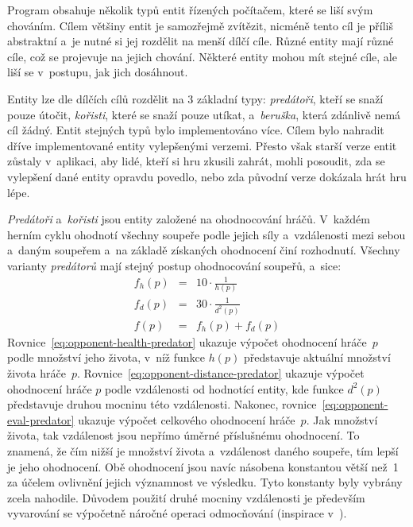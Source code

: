 Program obsahuje několik typů entit řízených počítačem, které se liší svým chováním. Cílem většiny entit je samozřejmě zvítězit, nicméně tento cíl je příliš abstraktní a~je nutné si jej rozdělit na menší dílčí cíle. Různé entity mají různé cíle, což se projevuje na jejich chování. Některé entity mohou mít stejné cíle, ale liší se v~postupu, jak jich dosáhnout.

Entity lze dle dílčích cílů rozdělit na 3 základní typy: \emph{predátoři}, kteří se snaží pouze útočit, \emph{kořisti}, které se snaží pouze utíkat, a~\emph{beruška}, která zdánlivě nemá cíl žádný. Entit stejných typů bylo implementováno více. Cílem bylo nahradit dříve implementované entity vylepšenými verzemi. Přesto však starší verze entit zůstaly v~aplikaci, aby lidé, kteří si hru zkusili zahrát, mohli posoudit, zda se vylepšení dané entity opravdu povedlo, nebo zda původní verze dokázala hrát hru lépe.

\emph{Predátoři} a~\emph{kořisti} jsou entity založené na ohodnocování hráčů. V~každém herním cyklu ohodnotí všechny soupeře podle jejich síly a~vzdálenosti mezi sebou a~daným soupeřem a~na základě získaných ohodnocení činí rozhodnutí. Všechny varianty \emph{predátorů} mají stejný postup ohodnocování soupeřů, a~sice:
\begin{eqnarray}
    \label{eq:opponent-health-predator}
    f_h(p) & = & 10 \cdot \frac{1}{h(p)} \\
    \label{eq:opponent-distance-predator}
    f_d(p) & = & 30 \cdot \frac{1}{d^2(p)} \\
    \label{eq:opponent-eval-predator}
    f(p) & = & f_h(p) + f_d(p)
\end{eqnarray}
Rovnice~\eqref{eq:opponent-health-predator} ukazuje výpočet ohodnocení hráče~$p$ podle množství jeho života, v~níž funkce $h(p)$ představuje aktuální množství života hráče~$p$. Rovnice~\eqref{eq:opponent-distance-predator} ukazuje výpočet ohodnocení hráče $p$ podle vzdálenosti od hodnotící entity, kde funkce $d^2(p)$ představuje druhou mocninu této vzdálenosti. Nakonec, rovnice~\eqref{eq:opponent-eval-predator} ukazuje výpočet celkového ohodnocení hráče~$p$. Jak množství života, tak vzdálenost jsou nepřímo úměrné příslušnému ohodnocení. To znamená, že čím nižší je množství života a~vzdálenost daného soupeře, tím lepší je jeho ohodnocení. Obě ohodnocení jsou navíc násobena konstantou větší než~1 za účelem ovlivnění jejich významnost ve výsledku. Tyto konstanty byly vybrány zcela nahodile. Důvodem použití druhé mocniny vzdálenosti je především vyvarování se výpočetně náročné operaci odmocňování (inspirace v~\cite{CGAL_Exact_Computation_paradigm}).

